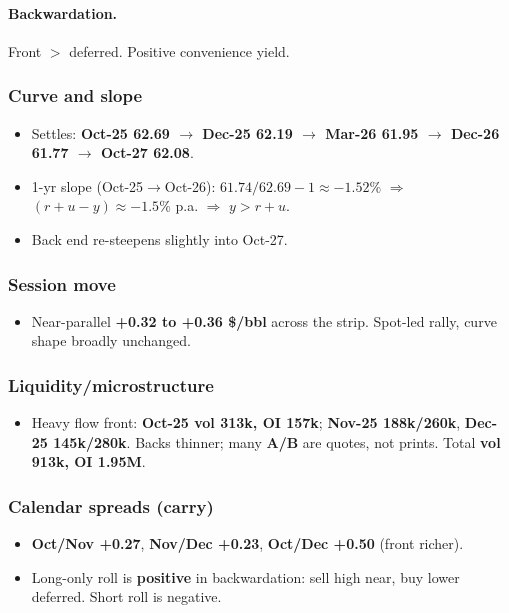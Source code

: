 \documentclass[11pt,a4paper]{article} %
\begin{document}
\paragraph{Backwardation.} Front $>$ deferred. Positive convenience yield.

\subsubsection*{Curve and slope}
\begin{itemize}
  \item Settles: \textbf{Oct-25 62.69 $\rightarrow$ Dec-25 62.19 $\rightarrow$ Mar-26 61.95 $\rightarrow$ Dec-26 61.77 $\rightarrow$ Oct-27 62.08}.
  \item 1-yr slope (Oct-25$\rightarrow$Oct-26): $61.74/62.69-1\approx -1.52\%$ $\Rightarrow$ $(r+u-y)\approx -1.5\%$ p.a. $\Rightarrow$ $y>r+u$.
  \item Back end re-steepens slightly into Oct-27.
\end{itemize}

\subsubsection*{Session move}
\begin{itemize}
  \item Near-parallel \textbf{+0.32 to +0.36 \$/bbl} across the strip. Spot-led rally, curve shape broadly unchanged.
\end{itemize}

\subsubsection*{Liquidity/microstructure}
\begin{itemize}
  \item Heavy flow front: \textbf{Oct-25 vol 313k, OI 157k}; \textbf{Nov-25 188k/260k}, \textbf{Dec-25 145k/280k}. Backs thinner; many \textbf{A/B} are quotes, not prints. Total \textbf{vol 913k, OI 1.95M}.
\end{itemize}

\subsubsection*{Calendar spreads (carry)}
\begin{itemize}
  \item \textbf{Oct/Nov +0.27}, \textbf{Nov/Dec +0.23}, \textbf{Oct/Dec +0.50} (front richer).
  \item Long-only roll is \textbf{positive} in backwardation: sell high near, buy lower deferred. Short roll is negative.
\end{itemize}
\end{document}
